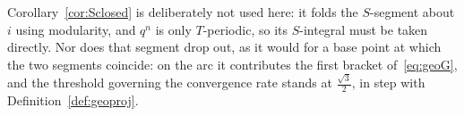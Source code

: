 \documentclass[11pt]{article}
\begin{document}

Corollary~\ref{cor:Sclosed} is deliberately not used here: it folds the $S$-segment about $i$ using
modularity, and $q^{n}$ is only $T$-periodic, so its $S$-integral must be taken directly. Nor does
that segment drop out, as it would for a base point at which the two segments coincide: on the arc
it contributes the first bracket of~\eqref{eq:geoG}, and the threshold governing the convergence
rate stands at $\tfrac{\sqrt3}{2}$, in step with Definition~\ref{def:geoproj}.
\end{document}
